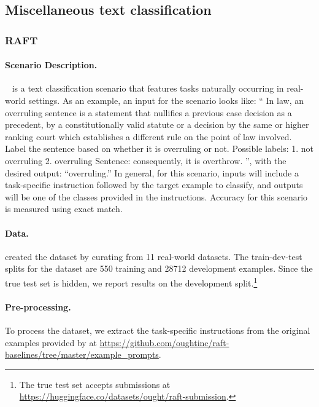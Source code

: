 \subsection{Miscellaneous text classification}
\label{app:scenarios-text-classification}
\subsubsection{RAFT}
\paragraph{Scenario Description.}
\raft~\citep{alex2021raft} is a text classification scenario that features tasks naturally occurring in real-world settings.
As an example, an input for the scenario looks like: ``
In law, an overruling sentence is a statement that nullifies a previous case decision as a precedent, by a constitutionally valid statute or a decision by the same or higher ranking court which establishes a different rule on the point of law involved. Label the sentence based on whether it is overruling or not. Possible labels: 1. not overruling 2. overruling
Sentence: consequently, it is overthrow.
'', with the desired output: ``overruling.''
In general, for this scenario, inputs will include a task-specific instruction followed by the target example to classify, and outputs will be one of the classes provided in the instructions.
Accuracy for this scenario is measured using exact match. 

\paragraph{Data.}
\citet{alex2021raft} created the dataset by curating from 11 real-world datasets.
The train-dev-test splits for the dataset are 550 training and 28712 development examples.
Since the true test set is hidden, we report results on the development split.\footnote{The true test set accepts submissions at \url{https://huggingface.co/datasets/ought/raft-submission}.}

\paragraph{Pre-processing.}
To process the dataset, we extract the task-specific instructions from the original examples provided by \citet{alex2021raft} at \url{https://github.com/oughtinc/raft-baselines/tree/master/example_prompts}.

